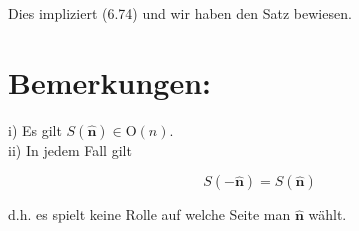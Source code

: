 \documentclass[10pt]{article}
\begin{document}
Dies impliziert (6.74) und wir haben den Satz bewiesen.

\section*{Bemerkungen:}
i) Es gilt $S(\hat{\mathbf{n}}) \in \mathrm{O}(n)$.\\
ii) In jedem Fall gilt


\begin{equation*}
S(-\hat{\mathbf{n}})=S(\hat{\mathbf{n}}) \tag{6.78}
\end{equation*}


d.h. es spielt keine Rolle auf welche Seite man $\hat{\mathbf{n}}$ wählt.
\end{document}
